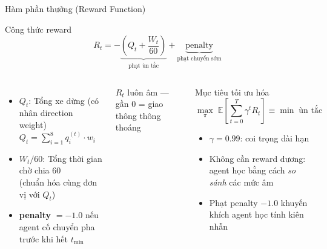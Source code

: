 \begin{frame}{Hàm phần thưởng (Reward Function)}
  \begin{block}{Công thức reward}
    \[R_t = -\!\underbrace{\left(Q_t + \dfrac{W_t}{60}\right)}_{\text{phạt ùn tắc}} + \underbrace{\text{penalty}}_{\text{phạt chuyển sớm}}\]
  \end{block}
  \vspace{6pt}
  \begin{columns}[T]
    \begin{itemize}
      \item \textbf{$Q_t$}: Tổng xe dừng (có nhân direction weight)\\
            $Q_t = \sum_{i=1}^{8} q_i^{(t)} \cdot w_i$
      \vspace{4pt}
      \item \textbf{$W_t/60$}: Tổng thời gian chờ chia 60\\
            (chuẩn hóa cùng đơn vị với $Q_t$)
      \vspace{4pt}
      \item \textbf{penalty} $= -1.0$ nếu agent cố chuyển pha trước khi hết $t_{\min}$
    \end{itemize}
    \vspace{4pt}
    \begin{exampleblock}{}
      $R_t$ luôn \alert{âm} — gần 0 = giao thông thông thoáng
    \end{exampleblock}

    \begin{block}{Mục tiêu tối ưu hóa}
      \[\max_\pi\;\mathbb{E}\!\left[\sum_{t=0}^{T}\gamma^t R_t\right] \equiv \min\;\text{ùn tắc}\]
      \begin{itemize}
        \item $\gamma = 0.99$: coi trọng dài hạn
        \item Không cần reward dương: agent học bằng cách \textit{so sánh} các mức âm
        \item Phạt penalty $-1.0$ khuyến khích agent học tính kiên nhẫn
      \end{itemize}
    \end{block}
  \end{columns}
\end{frame}

